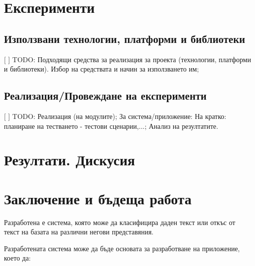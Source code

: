 \documentclass[12pt]{article}
\begin{document}
    

\section{Експерименти}

\subsection{Използвани технологии, платформи и библиотеки}

[ ] TODO: Подходящи средства за реализация за проекта (технологии, платформи и библиотеки). Избор на средствата и начин за използването им;


\subsection{Реализация/Провеждане на експерименти}

[ ] TODO: Реализация (на модулите); 
За система/приложение: На кратко: планиране на тестването - тестови сценарии,...; Анализ на резултатите.



\section{Резултати. Дискусия}



\section{Заключение и бъдеща работа}

Разработена е система, която може да класифицира даден текст или откъс от текст на базата на различни негови представяния.

Разработената система може да бъде основата за разработване на приложение, което да:
\end{document}
